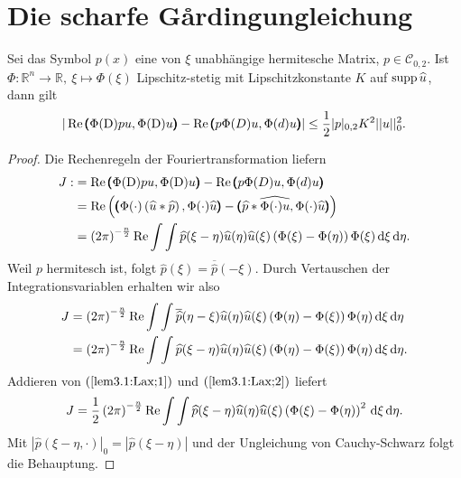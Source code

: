 \section{Die scharfe G\r{a}rdingungleichung}



\begin{lem}\label{lem3.1:Lax}
	Sei das Symbol $p(x)$ eine von $\xi$ unabhängige hermitesche Matrix, $p\in \mathcal{C}_{0,2}$. Ist $\Phi: \mathbb{R}^n\rightarrow\mathbb{R}, \ \xi \mapsto\Phi(\xi)$ Lipschitz-stetig mit Lipschitzkonstante $K$ auf $\operatorname{supp} \widehat{u}$, dann gilt
	\begin{align}
		| \operatorname{Re} \pmb(\Phi(\mathrm D)pu,\Phi(\mathrm D)u\pmb)-\operatorname{Re}\pmb(p\Phi(D)u,\Phi(d)u\pmb)| \le\frac{1}{2}| p|_{0,2}K^2|| u||_0^2.
\end{align}	 
\end{lem}
\begin{proof}
	Die Rechenregeln der Fouriertransformation liefern
	\begin{align}\label{lem3.1:Lax;1}
		\begin{split} J:&=  \operatorname{Re} \pmb(\Phi(\mathrm D)pu,\Phi(\mathrm D)u\pmb)-\operatorname{Re}\pmb(p\Phi(D)u,\Phi(d)u\pmb) \\
		&=\operatorname{Re} \left( \pmb(\Phi(\cdot)\left(\widehat{u}\ast \widehat{p}\right),\Phi(\cdot)\widehat{u}\pmb)-\pmb(\widehat{p}\ast\widehat{\Phi(\cdot)u},\Phi(\cdot)\widehat{u}\pmb)\right)\\
		&= \left(2\pi\right)^{-\frac{n}{2}}\operatorname{Re}\int\int\widehat{p}(\xi-\eta)\widehat{u}(\eta)\widehat{u}(\xi)\left(\Phi(\xi)-\Phi(\eta)\right)\Phi(\xi)\,\mathrm d \xi\,\mathrm d\eta.
		\end{split}
	\end{align}
	Weil $p$ hermitesch ist, folgt $\widehat{p}(\xi) = \overline{\widehat{p}}(-\xi)$. Durch Vertauschen der Integrationsvariablen erhalten wir also
	\begin{align}\label{lem3.1:Lax;2}
	\begin{split}	J&= \left(2\pi\right)^{-\frac{n}{2}}\operatorname{Re}\int\int\overline{\widehat{p}}(\eta-\xi)\widehat{u}(\eta)\widehat{u}(\xi)\left(\Phi(\eta)-\Phi(\xi)\right)\Phi(\eta)\,\mathrm d \xi\,\mathrm d\eta\\
		&= \left(2\pi\right)^{-\frac{n}{2}}\operatorname{Re}\int\int\widehat{p}(\xi-\eta)\widehat{u}(\eta)\widehat{u}(\xi)\left(\Phi(\eta)-\Phi(\xi)\right)\Phi(\eta)\,\mathrm d \xi\,\mathrm d\eta.
	\end{split}	
	\end{align}
	Addieren von $(\ref{lem3.1:Lax;1})$ und $(\ref{lem3.1:Lax;2})$ liefert
	\begin{align}
		J= \frac{1}{2}\left(2\pi\right)^{-\frac{n}{2}}\operatorname{Re}\int\int \widehat{p}(\xi-\eta)\widehat{u}(\eta)\widehat{u}(\xi)\left(\Phi(\xi)-\Phi(\eta)\right)^2\,\mathrm d\xi\,\mathrm d\eta.
	\end{align}
	Mit $| \widehat{p}(\xi-\eta,\cdot)|_0 = | \widehat{p}(\xi-\eta)|$ und der Ungleichung von Cauchy-Schwarz folgt die Behauptung. 
\end{proof}

